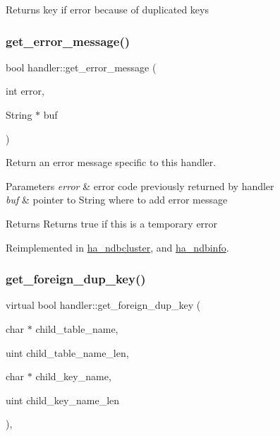 \begin{DoxyReturn}{Returns}
key if error because of duplicated keys 
\end{DoxyReturn}
\mbox{\label{classhandler_afce8ffd064ce683481494c7503ef820c}} 
\subsubsection{\texorpdfstring{get\+\_\+error\+\_\+message()}{get\_error\_message()}}
{\footnotesize\ttfamily bool handler\+::get\+\_\+error\+\_\+message (\begin{DoxyParamCaption}\item[{int}]{error,  }\item[{String $\ast$}]{buf }\end{DoxyParamCaption})\hspace{0.3cm}{\ttfamily [virtual]}}

Return an error message specific to this handler.


\begin{DoxyParams}{Parameters}
{\em error} & error code previously returned by handler \\
\hline
{\em buf} & pointer to String where to add error message\\
\hline
\end{DoxyParams}
\begin{DoxyReturn}{Returns}
Returns true if this is a temporary error 
\end{DoxyReturn}


Reimplemented in \mbox{\hyperlink{classha__ndbcluster_a31a5f675ffb30d67ba91bb1cb9ec9dc8}{ha\+\_\+ndbcluster}}, and \mbox{\hyperlink{classha__ndbinfo_ab3693b75133ce5d4e4861ef5627ebbdc}{ha\+\_\+ndbinfo}}.

\mbox{\label{classhandler_a20878b1fb8d31b91dbf53ac963d90f78}} 
\subsubsection{\texorpdfstring{get\+\_\+foreign\+\_\+dup\+\_\+key()}{get\_foreign\_dup\_key()}}
{\footnotesize\ttfamily virtual bool handler\+::get\+\_\+foreign\+\_\+dup\+\_\+key (\begin{DoxyParamCaption}\item[{char $\ast$}]{child\+\_\+table\+\_\+name,  }\item[{uint}]{child\+\_\+table\+\_\+name\+\_\+len,  }\item[{char $\ast$}]{child\+\_\+key\+\_\+name,  }\item[{uint}]{child\+\_\+key\+\_\+name\+\_\+len }\end{DoxyParamCaption})\hspace{0.3cm}{\ttfamily [inline]}, {\ttfamily [virtual]}}


